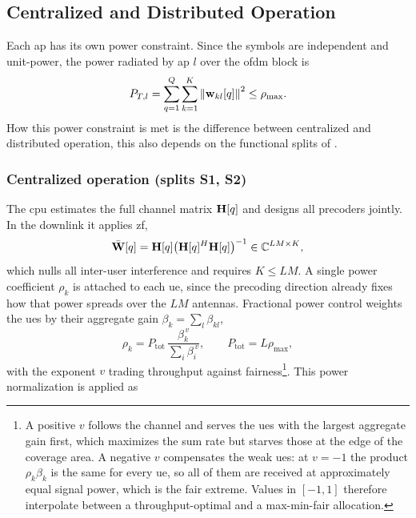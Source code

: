 \subsection{Centralized and Distributed Operation}
\label{ssec:operation}

Each \gls{ap} has its own power constraint. Since the symbols are independent
and unit-power, the power radiated by \gls{ap} $l$ over the \gls{ofdm} block is
\begin{equation}
\label{eq:ptl}
P_{T,l} = \sum_{q=1}^{Q}\sum_{k=1}^{K}\left\lVert\boldsymbol{\mathrm{w}}_{kl}[q]\right\rVert^{2} \leq \rho_{\max}.
\end{equation}
How this power constraint is met is the difference between centralized and distributed operation, this also depends on the functional splits of .

\subsubsection{Centralized operation (splits S1, S2)}
The \gls{cpu} estimates the full channel matrix $\boldsymbol{\mathrm{H}}[q]$ and designs all precoders jointly. In the downlink it applies
\gls{zf},
\begin{equation}
\label{eq:zf-precoder}
\bar{\boldsymbol{\mathrm{W}}}[q] = \boldsymbol{\mathrm{H}}[q]\big(\boldsymbol{\mathrm{H}}[q]^{H}\boldsymbol{\mathrm{H}}[q]\big)^{-1}
\in\mathbb{C}^{LM\times K},
\end{equation}
which nulls all inter-user interference and requires $K\leq LM$. A single power
coefficient $\rho_{k}$ is attached to each \gls{ue}, since the precoding direction already fixes how that power spreads over the $LM$ antennas. Fractional power control weights the \glspl{ue} by their aggregate gain $\beta_{k}=\sum_{l}\beta_{kl}$,
\begin{equation}
\label{eq:dl-fractional}
\rho_{k} = P_{\mathrm{tot}}\,\frac{\beta_{k}^{\,v}}{\sum_{i}\beta_{i}^{\,v}},
\qquad P_{\mathrm{tot}} = L\rho_{\max},
\end{equation}
with the exponent $v$ trading throughput against fairness\footnote{A positive $v$ follows the channel and serves the \glspl{ue} with the largest aggregate gain first, which maximizes the sum rate but starves those at the edge of the coverage area. A negative $v$ compensates the weak \glspl{ue}: at $v=-1$ the product
$\rho_{k}\beta_{k}$ is the same for every \gls{ue}, so all of them are received
at approximately equal signal power, which is the fair extreme. Values in
$[-1,1]$ therefore interpolate between a throughput-optimal and a max-min-fair
allocation.}. 
This power normalization is applied as
